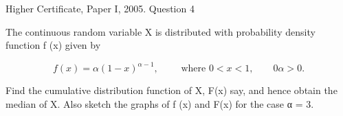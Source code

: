 \documentclass[a4paper,12pt]{article}
\begin{document}
Higher Certificate, Paper I, 2005. Question 4
\begin{framed}
The continuous random variable X is distributed with probability density
function f (x) given by

\[f(x) =  \alpha (1-x)^{\alpha-1}, \qquad \mbox{ where }0 < x < 1, \qquad 0 \alpha  > 0 .\]

Find the cumulative distribution function of X, F(x) say, and hence obtain the
median of X. Also sketch the graphs of f (x) and F(x) for the case α = 3.
\end{framed}

\end{document}
